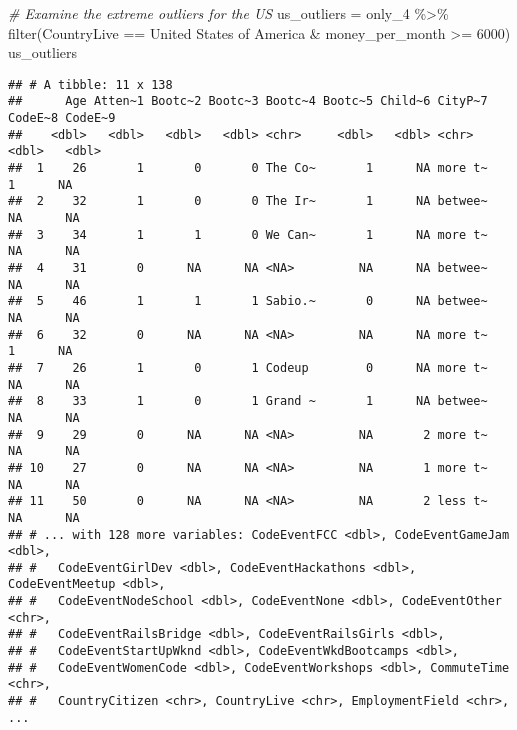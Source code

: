 \documentclass[
]{article}
\newenvironment{Shaded}{\begin{snugshade}}{\end{snugshade}}
\newcommand{\CommentTok}[1]{\textcolor[rgb]{0.56,0.35,0.01}{\textit{#1}}}
\newcommand{\DecValTok}[1]{\textcolor[rgb]{0.00,0.00,0.81}{#1}}
\newcommand{\FunctionTok}[1]{\textcolor[rgb]{0.00,0.00,0.00}{#1}}
\newcommand{\NormalTok}[1]{#1}
\newcommand{\OtherTok}[1]{\textcolor[rgb]{0.56,0.35,0.01}{#1}}
\newcommand{\SpecialCharTok}[1]{\textcolor[rgb]{0.00,0.00,0.00}{#1}}
\newcommand{\StringTok}[1]{\textcolor[rgb]{0.31,0.60,0.02}{#1}}
\begin{document}
\begin{Shaded}
\begin{Highlighting}[]
\CommentTok{\# Examine the extreme outliers for the US}
\NormalTok{us\_outliers }\OtherTok{=}\NormalTok{ only\_4 }\SpecialCharTok{\%\textgreater{}\%}
  \FunctionTok{filter}\NormalTok{(CountryLive }\SpecialCharTok{==} \StringTok{\textquotesingle{}United States of America\textquotesingle{}} \SpecialCharTok{\&} 
\NormalTok{           money\_per\_month }\SpecialCharTok{\textgreater{}=} \DecValTok{6000}\NormalTok{)}
\NormalTok{us\_outliers}
\end{Highlighting}
\end{Shaded}

\begin{verbatim}
## # A tibble: 11 x 138
##      Age Atten~1 Bootc~2 Bootc~3 Bootc~4 Bootc~5 Child~6 CityP~7 CodeE~8 CodeE~9
##    <dbl>   <dbl>   <dbl>   <dbl> <chr>     <dbl>   <dbl> <chr>     <dbl>   <dbl>
##  1    26       1       0       0 The Co~       1      NA more t~       1      NA
##  2    32       1       0       0 The Ir~       1      NA betwee~      NA      NA
##  3    34       1       1       0 We Can~       1      NA more t~      NA      NA
##  4    31       0      NA      NA <NA>         NA      NA betwee~      NA      NA
##  5    46       1       1       1 Sabio.~       0      NA betwee~      NA      NA
##  6    32       0      NA      NA <NA>         NA      NA more t~       1      NA
##  7    26       1       0       1 Codeup        0      NA more t~      NA      NA
##  8    33       1       0       1 Grand ~       1      NA betwee~      NA      NA
##  9    29       0      NA      NA <NA>         NA       2 more t~      NA      NA
## 10    27       0      NA      NA <NA>         NA       1 more t~      NA      NA
## 11    50       0      NA      NA <NA>         NA       2 less t~      NA      NA
## # ... with 128 more variables: CodeEventFCC <dbl>, CodeEventGameJam <dbl>,
## #   CodeEventGirlDev <dbl>, CodeEventHackathons <dbl>, CodeEventMeetup <dbl>,
## #   CodeEventNodeSchool <dbl>, CodeEventNone <dbl>, CodeEventOther <chr>,
## #   CodeEventRailsBridge <dbl>, CodeEventRailsGirls <dbl>,
## #   CodeEventStartUpWknd <dbl>, CodeEventWkdBootcamps <dbl>,
## #   CodeEventWomenCode <dbl>, CodeEventWorkshops <dbl>, CommuteTime <chr>,
## #   CountryCitizen <chr>, CountryLive <chr>, EmploymentField <chr>, ...
\end{verbatim}

\begin{Shaded}
\end{Shaded}
\end{document}
